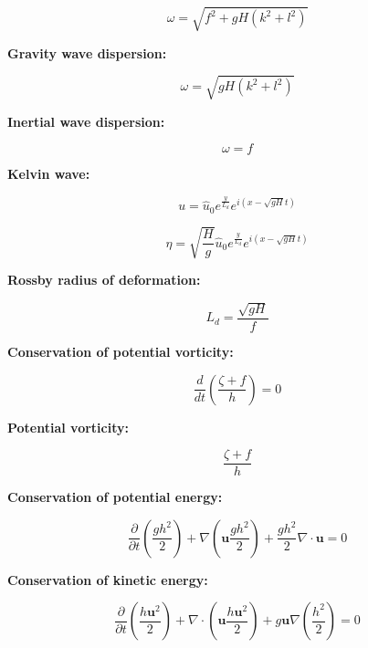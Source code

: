 \documentclass[12pt]{article}
\numberwithin{equation}{section}
\numberwithin{figure}{section}
\numberwithin{table}{section}
\begin{document}
\begin{equation}
  \omega = \sqrt{f^2 + gH(k^2 + l^2)}
\end{equation}

\textbf{Gravity wave dispersion:}

\begin{equation}
  \omega = \sqrt{gH(k^2 + l^2)}
\end{equation}

\textbf{Inertial wave dispersion:}

\begin{equation}
  \omega = f
\end{equation}

\textbf{Kelvin wave:}

\begin{equation}
  u = \widehat{u}_0 e^{\frac{y}{L_d}} e^{i(x - \sqrt{gH} t)}
\end{equation}

\begin{equation}
  \eta = \sqrt{\frac{H}{g}} \widehat{u}_0 e^{\frac{y}{L_d}} e^{i(x - \sqrt{gH} t)}
\end{equation}

\textbf{Rossby radius of deformation:}

\begin{equation}
  L_d = \frac{\sqrt{gH}}{f}
\end{equation}

\textbf{Conservation of potential vorticity:}

\begin{equation}
  \frac{d}{dt} \left( \frac{\zeta + f}{h} \right) = 0
\end{equation}

\textbf{Potential vorticity:}

\begin{equation}
  \frac{\zeta + f}{h}
\end{equation}

\textbf{Conservation of potential energy:}

\begin{equation}
  \frac{\partial}{\partial t} \left( \frac{gh^2}{2} \right) +
  \nabla \left( \mathbf{u} \frac{gh^2}{2} \right) +
  \frac{gh^2}{2} \nabla \cdot \mathbf{u} = 0
\end{equation}

\textbf{Conservation of kinetic energy:}

\begin{equation}
  \frac{\partial}{\partial t} \left( \frac{h \mathbf{u}^2}{2} \right)
  + \nabla \cdot \left( \mathbf{u} \frac{h \mathbf{u}^2}{2} \right)
  + g\mathbf{u}\nabla \left(\frac{h^2}{2}\right)
  = 0
\end{equation}
\end{document}

